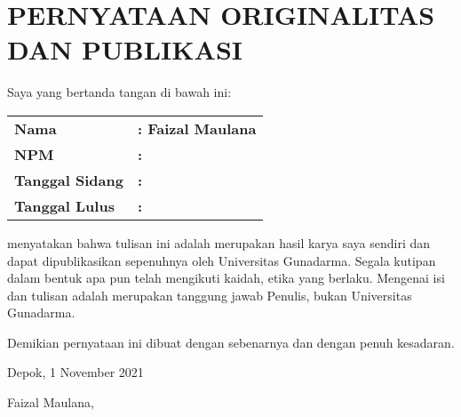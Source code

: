 \section{PERNYATAAN ORIGINALITAS DAN PUBLIKASI}
\vspace{1em}

Saya yang bertanda tangan di bawah ini:

\begin{table}[H]
  \begin{tabular}{l l}
    \textbf{Nama} & \textbf{: Faizal Maulana} \\
    \textbf{NPM} & \textbf{: } \\
    \textbf{Tanggal Sidang} & \textbf{: } \\
    \textbf{Tanggal Lulus} & \textbf{: }
  \end{tabular}
\end{table}

menyatakan bahwa tulisan ini adalah merupakan hasil karya saya sendiri dan dapat
dipublikasikan sepenuhnya oleh Universitas Gunadarma. Segala kutipan dalam
bentuk apa pun telah mengikuti kaidah, etika yang berlaku. Mengenai isi dan
tulisan adalah merupakan tanggung jawab Penulis, bukan Universitas Gunadarma.

Demikian pernyataan ini dibuat dengan sebenarnya dan dengan penuh kesadaran.

\vspace{1em}

Depok, 1 November 2021

\vspace{4em}

Faizal Maulana,
